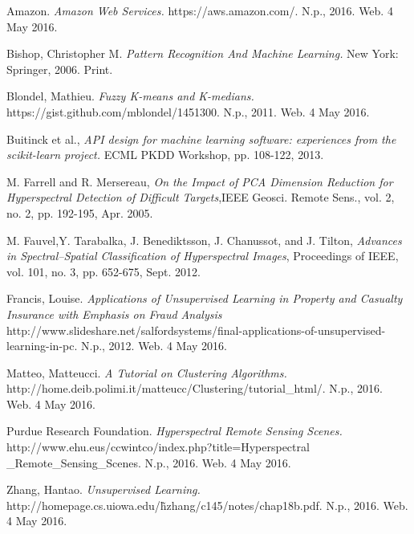 \documentclass[journal]{IEEEtran}
\begin{document}
\ifCLASSOPTIONcaptionsoff
  \newpage
\fi

\begin{thebibliography}{1}

  Amazon. \emph{Amazon Web Services.} https://aws.amazon.com/. N.p., 2016. Web. 4 May 2016.

  Bishop, Christopher M. \emph{Pattern Recognition And Machine Learning.} New York: Springer, 2006. Print.

  Blondel, Mathieu. \emph{Fuzzy K-means and K-medians.} https://gist.github.com/mblondel/1451300. N.p., 2011. Web. 4 May 2016.

  Buitinck et al., \emph{API design for machine learning software: experiences from the scikit-learn project.} ECML PKDD Workshop, pp. 108-122, 2013.

  M. Farrell and R. Mersereau, \emph{On the Impact of PCA Dimension Reduction for Hyperspectral Detection of Difficult Targets},IEEE Geosci. Remote Sens., vol. 2, no. 2, pp. 192-195, Apr. 2005.

  M. Fauvel,Y. Tarabalka, J. Benediktsson, J. Chanussot, and J. Tilton, \emph{Advances in Spectral–Spatial Classification of Hyperspectral Images}, Proceedings of IEEE, vol. 101, no. 3, pp. 652-675, Sept. 2012.

  Francis, Louise. \emph{Applications of Unsupervised Learning in Property and Casualty Insurance with Emphasis on Fraud Analysis} http://www.slideshare.net/salfordsystems/final-applications-of-unsupervised-learning-in-pc. N.p., 2012. Web. 4 May 2016.

  Matteo, Matteucci. \emph{A Tutorial on Clustering Algorithms.} http://home.deib.polimi.it/matteucc/Clustering/tutorial\_html/. N.p., 2016. Web. 4 May 2016.

  Purdue Research Foundation. \emph{Hyperspectral Remote Sensing Scenes.} http://www.ehu.eus/ccwintco/index.php?title=Hyperspectral \_Remote\_Sensing\_Scenes. N.p., 2016. Web. 4 May 2016.

  Zhang, Hantao. \emph{Unsupervised Learning.} http://homepage.cs.uiowa.edu/\~hzhang/c145/notes/chap18b.pdf. N.p., 2016. Web. 4 May 2016.

\end{thebibliography}
\end{document}
